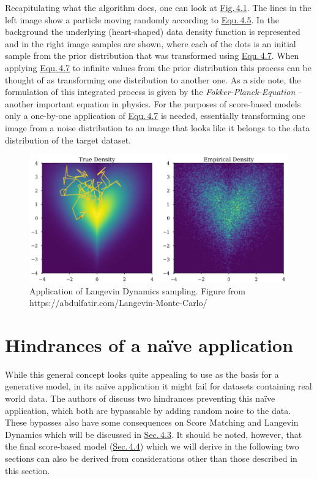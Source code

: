 Recapitulating what the algorithm does, one can look at \hyperref[fig:4.1]{Fig.\,4.1}. The lines in the left image show a particle moving randomly according to \hyperref[equ:4.5]{Equ.\,4.5}. In the background the underlying (heart-shaped) data density function  is represented and in the right image samples are shown, where each of the dots is an initial sample from the prior distribution that was transformed using \hyperref[equ:4.7]{Equ.\,4.7}. When applying \hyperref[equ:4.7]{Equ.\,4.7} to infinite values from the prior distribution this process can be thought of as transforming one distribution to another one. As a side note, the formulation of this integrated process is given by the \textit{Fokker-Planck-Equation} \cite{gardiner} – another important equation in physics. For the purposes of score-based models only a one-by-one application of \hyperref[equ:4.7]{Equ.\,4.7} is needed, essentially transforming one image from a noise distribution to an image that looks like it belongs to the data distribution of the target dataset.
%
\begin{figure}[] \label{fig:4.1}
    \centering
    \includegraphics[width=.8\textwidth]{Chapters/figures/langevin.PNG}
    \caption[Application of Langevin Dynamics sampling]{Application of Langevin Dynamics sampling. Figure from\\ https://abdulfatir.com/Langevin-Monte-Carlo/}
\end{figure}
\section{Hindrances of a na\"{i}ve application} \label{sec:4.2}
While this general concept looks quite appealing to use as the basis for a generative model, in its na\"{i}ve application it might fail for datasets containing real world data. The authors of \cite{score_1} discuss two hindrances preventing this na\"{i}ve application, which both are bypassable by adding random noise to the data. These bypasses also have some consequences on Score Matching and Langevin Dynamics which will be discussed in \hyperref[sec:4.3]{Sec.\,4.3}. It should be noted, however, that the final score-based model (\hyperref[sec:4.4]{Sec.\,4.4}) which we will derive in the following two sections can also be derived from considerations other than those described in this section.
%
